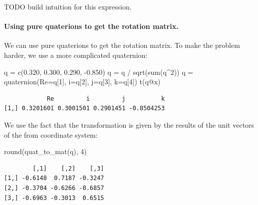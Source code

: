 \documentclass[
  letterpaper,
  DIV=11,
  numbers=noendperiod]{scrartcl}
\let\oldparagraph\paragraph
\renewcommand{\paragraph}[1]{\oldparagraph{#1}\mbox{}}
\newenvironment{Shaded}{\begin{snugshade}}{\end{snugshade}}
\newcommand{\AttributeTok}[1]{\textcolor[rgb]{0.40,0.45,0.13}{#1}}
\newcommand{\DecValTok}[1]{\textcolor[rgb]{0.68,0.00,0.00}{#1}}
\newcommand{\FloatTok}[1]{\textcolor[rgb]{0.68,0.00,0.00}{#1}}
\newcommand{\FunctionTok}[1]{\textcolor[rgb]{0.28,0.35,0.67}{#1}}
\newcommand{\NormalTok}[1]{\textcolor[rgb]{0.00,0.23,0.31}{#1}}
\newcommand{\OtherTok}[1]{\textcolor[rgb]{0.00,0.23,0.31}{#1}}
\newcommand{\SpecialCharTok}[1]{\textcolor[rgb]{0.37,0.37,0.37}{#1}}
\begin{document}
TODO build intuition for this expression.

\hypertarget{using-pure-quaterions-to-get-the-rotation-matrix.}{%
\paragraph{Using pure quaterions to get the rotation
matrix.}\label{using-pure-quaterions-to-get-the-rotation-matrix.}}

We can use pure quaterions to get the rotation matrix. To make the
problem harder, we use a more complicated quaternion:

\begin{Shaded}
\begin{Highlighting}[]
\NormalTok{q }\OtherTok{=} \FunctionTok{c}\NormalTok{(}\FloatTok{0.320}\NormalTok{,  }\FloatTok{0.300}\NormalTok{,  }\FloatTok{0.290}\NormalTok{, }\SpecialCharTok{{-}}\FloatTok{0.850}\NormalTok{) }
\NormalTok{q }\OtherTok{=}\NormalTok{ q }\SpecialCharTok{/} \FunctionTok{sqrt}\NormalTok{(}\FunctionTok{sum}\NormalTok{(q}\SpecialCharTok{\^{}}\DecValTok{2}\NormalTok{))}
\NormalTok{q }\OtherTok{=} \FunctionTok{quaternion}\NormalTok{(}\AttributeTok{Re=}\NormalTok{q[}\DecValTok{1}\NormalTok{], }\AttributeTok{i=}\NormalTok{q[}\DecValTok{2}\NormalTok{], }\AttributeTok{j=}\NormalTok{q[}\DecValTok{3}\NormalTok{], }\AttributeTok{k=}\NormalTok{q[}\DecValTok{4}\NormalTok{])}
\FunctionTok{t}\NormalTok{(q}\SpecialCharTok{@}\NormalTok{x)}
\end{Highlighting}
\end{Shaded}

\begin{verbatim}
            Re         i         j          k
[1,] 0.3201601 0.3001501 0.2901451 -0.8504253
\end{verbatim}

We use the fact that the transformation is given by the results of the
unit vectors of the from coordinate system:

\begin{Shaded}
\begin{Highlighting}[]
 \FunctionTok{round}\NormalTok{(}\FunctionTok{quat\_to\_mat}\NormalTok{(q), }\DecValTok{4}\NormalTok{)}
\end{Highlighting}
\end{Shaded}

\begin{verbatim}
        [,1]    [,2]    [,3]
[1,] -0.6148  0.7187 -0.3247
[2,] -0.3704 -0.6266 -0.6857
[3,] -0.6963 -0.3013  0.6515
\end{verbatim}
\end{document}
